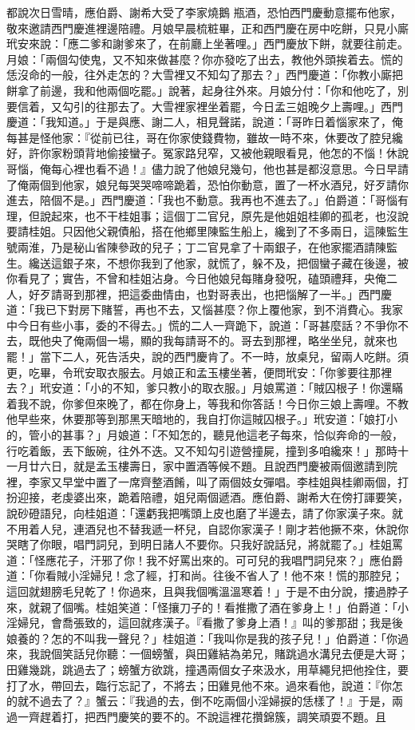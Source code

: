\begin{showcontents}{}
都說次日雪晴，應伯爵、謝希大受了李家燒鵝 瓶酒，恐怕西門慶動意擺布他家，敬來邀請西門慶進裡邊陪禮。月娘早晨梳粧畢，正和西門慶在房中吃餅，只見小廝玳安來說：「應二爹和謝爹來了，在前廳上坐著哩。」西門慶放下餅，就要往前走。月娘：「兩個勾使鬼，又不知來做甚麼？你亦發吃了出去，教他外頭挨着去。慌的恁沒命的一般，往外走怎的？大雪裡又不知勾了那去？」西門慶道：「你教小廝把餅拿了前邊，我和他兩個吃罷。」說著，起身往外來。月娘分付：「你和他吃了，別要信着，又勾引的往那去了。大雪裡家裡坐着罷，今日孟三姐晚夕上壽哩。」西門慶道：「我知道。」于是與應、謝二人，相見聲諾，說道：「哥昨日着惱家來了，俺每甚是怪他家：『從前已往，哥在你家使錢費物，雖故一時不來，休要改了腔兒纔好，許你家粉頭背地偷接蠻子。冤家路兒窄，又被他親眼看見，他怎的不惱！休說哥惱，俺每心裡也看不過！』儘力說了他娘兒幾句，他也甚是都沒意思。今日早請了俺兩個到他家，娘兒每哭哭啼啼跪着，恐怕你動意，置了一杯水酒兒，好歹請你進去，陪個不是。」西門慶道：「我也不動意。我再也不進去了。」伯爵道：「哥惱有理，但說起來，也不干桂姐事；這個丁二官兒，原先是他姐姐桂卿的孤老，也沒說要請桂姐。只因他父親債船，搭在他鄉里陳監生船上，纔到了不多兩日，這陳監生號兩淮，乃是秘山省陳參政的兒子；丁二官見拿了十兩銀子，在他家擺酒請陳監生。纔送這銀子來，不想你我到了他家，就慌了，躲不及，把個蠻子藏在後邊，被你看見了；實告，不曾和桂姐沾身。今日他娘兒每賭身發呪，磕頭禮拜，央俺二人，好歹請哥到那裡，把這委曲情由，也對哥表出，也把惱解了一半。」西門慶道：「我已下對房下賭誓，再也不去，又惱甚麼？你上覆他家，到不消費心。我家中今日有些小事，委的不得去。」慌的二人一齊跪下，說道：「哥甚麼話？不爭你不去，既他央了俺兩個一場，顯的我每請哥不的。哥去到那裡，略坐坐兒，就來也罷！」當下二人，死告活央，說的西門慶肯了。不一時，放桌兒，留兩人吃餅。須更，吃畢，令玳安取衣服去。月娘正和孟玉樓坐著，便問玳安：「你爹要往那裡去？」玳安道：「小的不知，爹只教小的取衣服。」月娘罵道：「賊囚根子！你還瞞着我不說，你爹但來晚了，都在你身上，等我和你答話！今日你三娘上壽哩。不教他早些來，休要那等到那黑天暗地的，我自打你這賊囚根子。」玳安道：「娘打小的，管小的甚事？」月娘道：「不知怎的，聽見他這老子每來，恰似奔命的一般，行吃着飯，丟下飯碗，往外不迭。又不知勾引遊營撞屍，撞到多咱纔來！」那時十一月廿六日，就是孟玉樓壽日，家中置酒等候不題。且說西門慶被兩個邀請到院裡，李家又早堂中置了一席齊整酒餚，叫了兩個妓女彈唱。李桂姐與桂卿兩個，打扮迎接，老虔婆出來，跪着陪禮，姐兒兩個遞酒。應伯爵、謝希大在傍打諢要笑，說砂磴語兒，向桂姐道：「還虧我把嘴頭上皮也磨了半邊去，請了你家漢子來。就不用着人兒，連酒兒也不替我遞一杯兒，自認你家漢子！剛才若他撅不來，休說你哭瞎了你眼，唱門詞兒，到明日諸人不要你。只我好說話兒，將就罷了。」桂姐罵道：「怪應花子，汗邪了你！我不好罵出來的。可可兒的我唱門詞兒來？」應伯爵道：「你看賊小淫婦兒！念了經，打和尚。往後不省人了！他不來！慌的那腔兒；這回就翅膀毛兒乾了！你過來，且與我個嘴溫溫寒着！」于是不由分說，摟過脖子來，就親了個嘴。桂姐笑道：「怪攘刀子的！看推撒了酒在爹身上！」伯爵道：「小淫婦兒，會喬張致的，這回就疼漢子。『看撒了爹身上酒！』叫的爹那甜；我是後娘養的？怎的不叫我一聲兒？」桂姐道：「我叫你是我的孩子兒！」伯爵道：「你過來，我說個笑話兒你聽：一個螃蟹，與田雞結為弟兄，賭跳過水溝兒去便是大哥；田雞幾跳，跳過去了；螃蟹方欲跳，撞遇兩個女子來汲水，用草繩兒把他拴住，要打了水，帶回去，臨行忘記了，不將去；田雞見他不來。過來看他，說道：『你怎的就不過去了？』蟹云：『我過的去，倒不吃兩個小淫婦捩的恁樣了！』于是，兩過一齊趕着打，把西門慶笑的要不的。不說這裡花攢錦簇，調笑頑耍不題。且
\end{showcontents}
